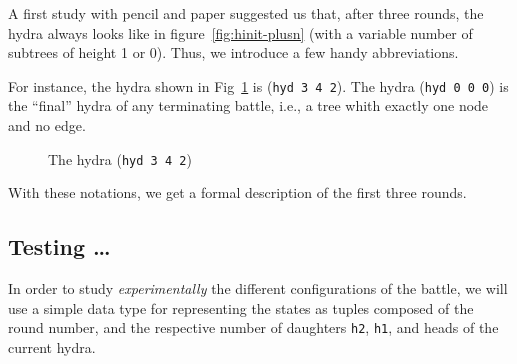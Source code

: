 A first study with pencil and paper suggested us that, after three rounds, the hydra always looks like in figure~\vref{fig:hinit-plusn} (with a variable number of 
subtrees of height 1 or 0).
Thus, we introduce a few handy abbreviations.




For instance, the hydra shown in  Fig~\ref{fig:hinit-plusn} is  (\texttt{hyd 3 4 2}). The hydra (\texttt{hyd 0 0 0})  is the ``final'' hydra of any terminating battle, {i.e.},
a tree whith exactly one node and no edge.

\begin{figure}[h]
  \centering

  \caption{The hydra (\texttt{hyd 3 4 2})}
  \label{fig:hinit-plusn}
\end{figure}


With these notations, we get a formal description of the first three rounds.




\subsection{Testing  \dots}
\label{sect:testing}
In order to study \emph{experimentally} the different  configurations of the  battle, we will use a simple data type for representing the states as tuples composed of
the round number, and the respective number of daughters  \texttt{h2}, \texttt{h1}, and heads
of the current hydra.


